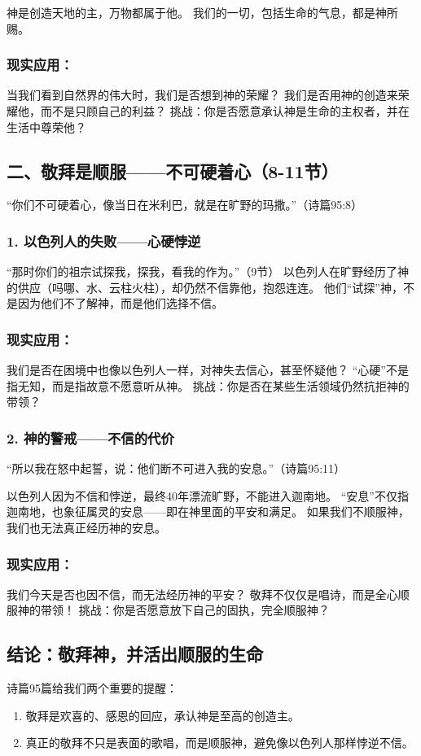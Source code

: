 \documentclass[a4paper, 12pt]{article}
\begin{document}
神是创造天地的主，万物都属于他。
我们的一切，包括生命的气息，都是神所赐。
\subsubsection*{现实应用：}

当我们看到自然界的伟大时，我们是否想到神的荣耀？
我们是否用神的创造来荣耀他，而不是只顾自己的利益？
挑战：你是否愿意承认神是生命的主权者，并在生活中尊荣他？

\subsection*{二、敬拜是顺服——不可硬着心（8-11节）}
“你们不可硬着心，像当日在米利巴，就是在旷野的玛撒。”（诗篇95:8）

\subsubsection*{1. 以色列人的失败——心硬悖逆}
“那时你们的祖宗试探我，探我，看我的作为。”（9节）
以色列人在旷野经历了神的供应（吗哪、水、云柱火柱），却仍然不信靠他，抱怨连连。
他们“试探”神，不是因为他们不了解神，而是他们选择不信。
\subsubsection*{现实应用：}

我们是否在困境中也像以色列人一样，对神失去信心，甚至怀疑他？
“心硬”不是指无知，而是指故意不愿意听从神。
挑战：你是否在某些生活领域仍然抗拒神的带领？

\subsubsection*{2. 神的警戒——不信的代价}
“所以我在怒中起誓，说：他们断不可进入我的安息。”（诗篇95:11）

以色列人因为不信和悖逆，最终40年漂流旷野，不能进入迦南地。
“安息”不仅指迦南地，也象征属灵的安息——即在神里面的平安和满足。
如果我们不顺服神，我们也无法真正经历神的安息。
\subsubsection*{现实应用：}

我们今天是否也因不信，而无法经历神的平安？
敬拜不仅仅是唱诗，而是全心顺服神的带领！
挑战：你是否愿意放下自己的固执，完全顺服神？

\subsection*{结论：敬拜神，并活出顺服的生命}
诗篇95篇给我们两个重要的提醒：
\begin{enumerate}
    \item 敬拜是欢喜的、感恩的回应，承认神是至高的创造主。

    \item 真正的敬拜不只是表面的歌唱，而是顺服神，避免像以色列人那样悖逆不信。

\end{enumerate}
\end{document}
